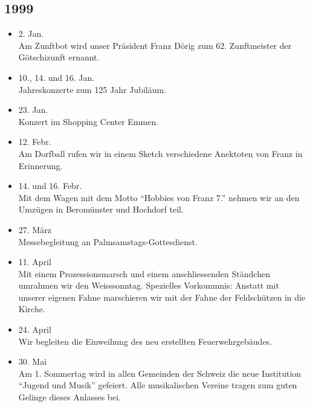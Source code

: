 \subsection{1999}

\begin{history}


    \begin{itemize}

        \item 2. Jan.\\
              Am Zunftbot wird unser Präsident Franz Dörig zum 62. Zunftmeister der
              Götschizunft ernannt.

        \item 10., 14. und 16. Jan.\\
              Jahreskonzerte zum 125 Jahr Jubiläum.

        \item 23. Jan.\\
              Konzert im Shopping Center Emmen.

        \item 12. Febr.\\
              Am Dorfball rufen wir in einem Sketch verschiedene Anektoten von Franz
              in Erinnerung.

        \item 14. und 16. Febr.\\
              Mit dem Wagen mit dem Motto \enquote{Hobbies von Franz 7.} nehmen wir an
              den Umzügen in Beromünster und Hochdorf teil.

        \item 27. März\\
              Messebegleitung an Palmsamstags-Gottesdienst.

        \item 11. April\\
              Mit einem Prozessionsmarsch und einem anschliessenden Ständchen umrahmen
              wir den Weisssonntag. Spezielles Vorkommnis: Anstatt mit unserer eigenen
              Fahne marschieren wir mit der Fahne der Feldschützen in die Kirche.

        \item 24. April\\
              Wir begleiten die Einweihung des neu erstellten Feuerwehrgebäudes.

        \item 30. Mai\\
              Am 1. Sommertag wird in allen Gemeinden der Schweiz die neue Institution
              \enquote{Jugend und Musik} gefeiert. Alle musikalischen Vereine tragen
              zum guten Gelinge dieses Anlasses bei.


\end{itemize}
\end{history}
